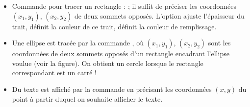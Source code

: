 \documentclass[11pt,class=report,crop=false]{standalone}
\begin{document}
\begin{cours}
\begin{itemize}
  \item Commande pour tracer un rectangle :  ; il suffit de préciser les coordonnées $(x_1,y_1)$, $(x_2,y_2)$ de deux sommets opposés. L'option  ajuste l'épaisseur du trait,  définit la couleur de ce trait,  définit la couleur de remplissage.
  
  \item Une ellipse est tracée par la commande , où $(x_1,y_1)$, $(x_2,y_2)$ sont les coordonnées de deux sommets opposés d'un rectangle encadrant l'ellipse voulue (voir la figure). On obtient un cercle lorsque le rectangle correspondant est un carré !  
  
  \item Du texte est affiché par la commande  en précisant les coordonnées $(x,y)$ du point à partir duquel on souhaite afficher le texte. 
  
\end{itemize}


\end{cours}


\end{document}
